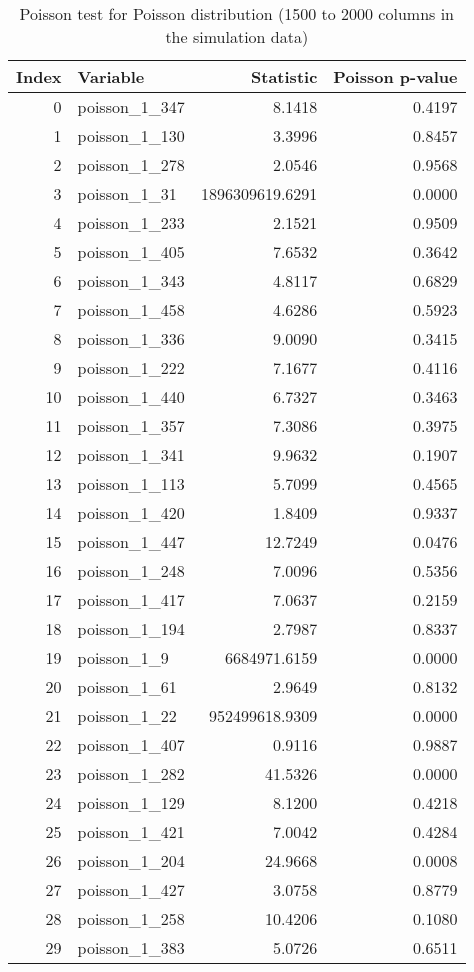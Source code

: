 \begin{table}[!h]
\centering
\caption{Poisson test for Poisson distribution (1500 to 2000 columns in the simulation data)}
\label{tab:poisson_metrics}
\begin{tabular}{r l r r}
\toprule
\textbf{Index} & \textbf{Variable} & \textbf{Statistic} & \textbf{Poisson p-value} \\
\midrule
0  & poisson\_1\_347 & 8.1418 & 0.4197 \\
1  & poisson\_1\_130 & 3.3996 & 0.8457 \\
2  & poisson\_1\_278 & 2.0546 & 0.9568 \\
3  & poisson\_1\_31  & 1896309619.6291 & 0.0000 \\
4  & poisson\_1\_233 & 2.1521 & 0.9509 \\
5  & poisson\_1\_405 & 7.6532 & 0.3642 \\
6  & poisson\_1\_343 & 4.8117 & 0.6829 \\
7  & poisson\_1\_458 & 4.6286 & 0.5923 \\
8  & poisson\_1\_336 & 9.0090 & 0.3415 \\
9  & poisson\_1\_222 & 7.1677 & 0.4116 \\
10 & poisson\_1\_440 & 6.7327 & 0.3463 \\
11 & poisson\_1\_357 & 7.3086 & 0.3975 \\
12 & poisson\_1\_341 & 9.9632 & 0.1907 \\
13 & poisson\_1\_113 & 5.7099 & 0.4565 \\
14 & poisson\_1\_420 & 1.8409 & 0.9337 \\
15 & poisson\_1\_447 & 12.7249 & 0.0476 \\
16 & poisson\_1\_248 & 7.0096 & 0.5356 \\
17 & poisson\_1\_417 & 7.0637 & 0.2159 \\
18 & poisson\_1\_194 & 2.7987 & 0.8337 \\
19 & poisson\_1\_9   & 6684971.6159 & 0.0000 \\
20 & poisson\_1\_61  & 2.9649 & 0.8132 \\
21 & poisson\_1\_22  & 952499618.9309 & 0.0000 \\
22 & poisson\_1\_407 & 0.9116 & 0.9887 \\
23 & poisson\_1\_282 & 41.5326 & 0.0000 \\
24 & poisson\_1\_129 & 8.1200 & 0.4218 \\
25 & poisson\_1\_421 & 7.0042 & 0.4284 \\
26 & poisson\_1\_204 & 24.9668 & 0.0008 \\
27 & poisson\_1\_427 & 3.0758 & 0.8779 \\
28 & poisson\_1\_258 & 10.4206 & 0.1080 \\
29 & poisson\_1\_383 & 5.0726 & 0.6511 \\
\bottomrule
\end{tabular}
\end{table}


